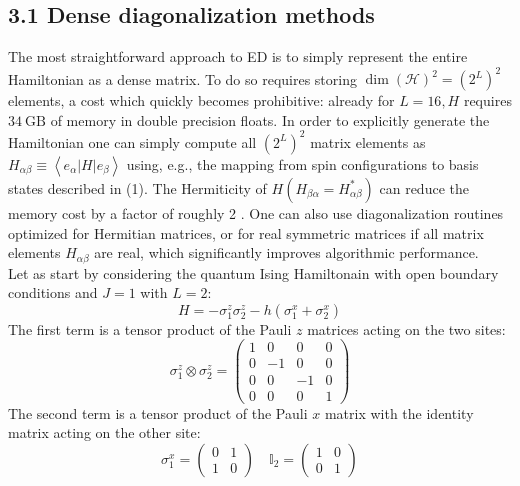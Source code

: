 \documentclass[12pt]{article}
\begin{document}
\subsection*{3.1 Dense diagonalization methods}
The most straightforward approach to ED is to simply represent the entire Hamiltonian as a dense matrix. To do so requires storing $\operatorname{dim}(\mathcal{H})^{2}=\left(2^{L}\right)^{2}$ elements, a cost which quickly becomes prohibitive: already for $L=16, H$ requires $34 \mathrm{~GB}$ of memory in double precision floats. In order to explicitly generate the Hamiltonian one can simply compute all $\left(2^{L}\right)^{2}$ matrix elements as $H_{\alpha \beta} \equiv\left\langle e_{\alpha}|H| e_{\beta}\right\rangle$ using, e.g., the mapping from spin configurations to basis states described in (1). The Hermiticity of $H\left(H_{\beta \alpha}=H_{\alpha \beta}^{*}\right)$ can reduce the memory cost by a factor of roughly 2 . One can also use diagonalization routines optimized for Hermitian matrices, or for real symmetric matrices if all matrix elements $H_{\alpha \beta}$ are real, which significantly improves algorithmic performance.\\
Let as start by considering the quantum Ising Hamiltonain with open boundary conditions and $J=1$ with $L=2$:
\begin{equation}
    H = -\sigma_{1}^{z} \sigma_{2}^{z} - h(\sigma_{1}^{x} + \sigma_{2}^{x})
\end{equation}
The first term is a tensor product of the Pauli $z$ matrices acting on the two sites:
\begin{equation}
    \sigma_{1}^{z} \otimes \sigma_{2}^{z} = \begin{pmatrix} 1 & 0 & 0 & 0 \\ 0 & -1 & 0 & 0 \\ 0 & 0 & -1 & 0 \\ 0 & 0 & 0 & 1 \end{pmatrix}
\end{equation}
The second term is a tensor product of the Pauli $x$ matrix with the identity matrix acting on the other site:
\begin{equation}
    \sigma_{1}^{x} = \begin{pmatrix} 0 & 1 \\ 1 & 0 \end{pmatrix} \quad \mathbb{I}_{2} = \begin{pmatrix} 1 & 0 \\ 0 & 1 \end{pmatrix}
\end{equation}
\end{document}
